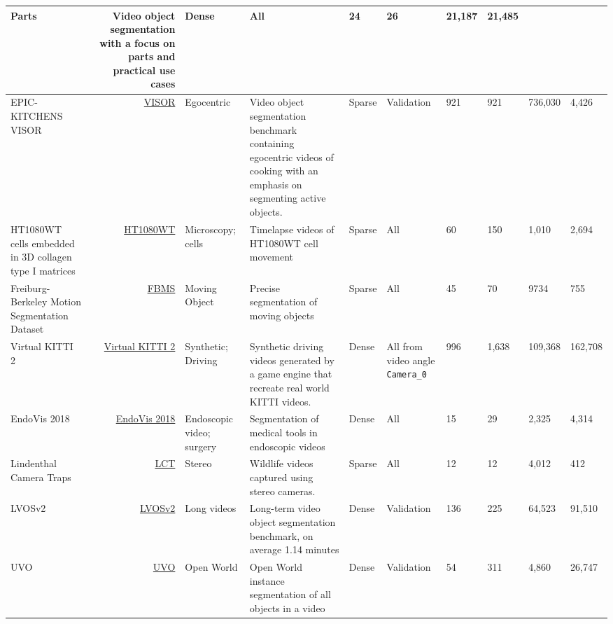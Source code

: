 \documentclass[]{fairmeta}
\begin{document}
\begin{table}[!ht]
{\begin{tabular}{L{3.5cm} r | l | L{7cm}| l | L{3.2cm} | l l l l}
Parts &
Video object segmentation with a focus on parts and practical use cases &
Dense & All & 24 & 26 & 21,187 &  21,485 \\ \hline
EPIC-KITCHENS VISOR~\citep{darkhalil2022epic}   &
\href{https://epic-kitchens.github.io/VISOR/}{VISOR} &
Egocentric &
Video object segmentation benchmark containing egocentric videos of cooking with an emphasis on segmenting active objects. &
Sparse & Validation & 921 & 921 & 736,030 &  4,426 \\ \hline
HT1080WT cells embedded in 3D collagen type I matrices~\citep{gomez2021search}   &
\href{https://zenodo.org/records/5777994}{HT1080WT} &
Microscopy; cells &
Timelapse videos of HT1080WT cell movement  &
Sparse & All &60  & 150 & 1,010 &  2,694 \\ \hline
Freiburg-Berkeley Motion Segmentation Dataset~\citep{brox2010freiburg}   &
\href{https://lmb.informatik.uni-freiburg.de/resources/datasets/}{FBMS} &
Moving Object &
Precise segmentation of moving objects &
Sparse & All & 45 & 70 & 9734 &  755 \\ \hline
Virtual KITTI 2 ~\citep{cabon2020virtual}  &
\href{https://europe.naverlabs.com/research-old2/computer-vision/proxy-virtual-worlds-vkitti-2/}{Virtual KITTI 2} &
Synthetic; Driving&
Synthetic driving videos generated by a game engine that recreate real world KITTI videos.  &
Dense & All from video angle \texttt{Camera\_0} & 996 & 1,638 & 109,368 &  162,708 \\ \hline
EndoVis 2018~\citep{allan20202018} &
\href{https://zenodo.org/records/10527017}{EndoVis 2018} &
Endoscopic video; surgery&
Segmentation of medical tools in endoscopic videos &
Dense & All  &  15 &  29 & 2,325 &  4,314 \\ \hline
Lindenthal Camera Traps~\citep{haucke2021exploiting}  &
\href{https://lila.science/datasets/lindenthal-camera-traps/}{LCT} &
Stereo&
Wildlife videos captured using stereo cameras. &
Sparse & All  &  12 & 12 & 4,012 & 412 \\ \hline
LVOSv2~\citep{hong2024lvos}  &
\href{https://lingyihongfd.github.io/lvos.github.io/}{LVOSv2} &
Long videos&
Long-term video object segmentation benchmark, on average 1.14 minutes &
Dense & Validation &  136 & 225 & 64,523 &  91,510 \\ \hline
UVO~\citep{wang2021unidentified} &
\href{https://sites.google.com/view/unidentified-video-object}{UVO} &
Open World &
Open World instance segmentation of all objects in a video &
Dense & Validation  & 54 & 311 & 4,860 &  26,747 \\

\end{tabular}}
\end{table}
\end{document}
